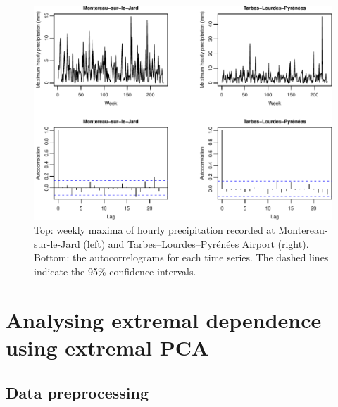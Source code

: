\documentclass[en-GB, a4paper, nobind]{templates/bathreport}
\begin{document}
\begin{figure}
\includegraphics[width=1\linewidth]{figures/fr-data-time-series-1} \caption[Raw time series and autocorrelograms for two weather stations.]{Top: weekly maxima of hourly precipitation recorded at Montereau-sur-le-Jard (left) and Tarbes–Lourdes–Pyrénées Airport (right). Bottom: the autocorrelograms for each time series. The dashed lines indicate the 95\% confidence intervals.}\label{fig:fr-data-time-series}
\end{figure}

\hypertarget{fr-pca-analysis}{%
\section{Analysing extremal dependence using extremal PCA}\label{fr-pca-analysis}}

\hypertarget{data-preprocessing}{%
\subsection{Data preprocessing}\label{data-preprocessing}}
\end{document}
